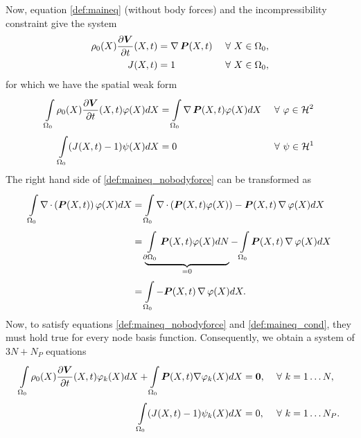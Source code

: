 Now, equation \eqref{def:maineq} (without body forces) and the incompressibility constraint give the system 
\begin{align}
	\rho_0(X)\frac{\partial \boldsymbol{V}}{\partial t}(X,t) &= \operatorname{\nabla}\boldsymbol{P}(X,t) && ~\forall~ X\in\Omega_0,\label{def:maineq_nobodyforce}\\
	J(X,t) &= 1 && ~\forall~ X\in\Omega_0,\label{def:maineq_cond}
\end{align}
for which we have the spatial weak form
\begin{align}
	\int\limits_{\Omega_0}^{}\rho_0(X)\frac{\partial \boldsymbol{V}}{\partial t}(X,t)\varphi(X)dX &= \int\limits_{\Omega_0}^{}\operatorname{\nabla}\boldsymbol{P}(X,t)\varphi(X)dX &&~\forall~ \varphi\in\mathcal{H}^2\\
	\int\limits_{\Omega_0}^{} (J(X,t)-1)\psi(X)dX &= 0 && ~\forall~ \psi\in\mathcal{H}^1
\end{align}
The right hand side of \eqref{def:maineq_nobodyforce} can be transformed as
\begin{align*}
	\int\limits_{\Omega_0}^{} \operatorname{\nabla}\cdot\left(\boldsymbol{P}(X,t)\right)\varphi(X) dX &= \int\limits_{\Omega_0}^{} \operatorname{\nabla}\cdot\left(\boldsymbol{P}(X,t)\varphi(X)\right) - \boldsymbol{P}(X,t)\operatorname{\nabla}\varphi(X) dX\\
		 &= \underbrace{\int\limits_{\partial\Omega_0}^{} \boldsymbol{P}(X,t)\varphi(X) dN}_{=0} - \int\limits_{\Omega_0}^{} \boldsymbol{P}(X,t)\operatorname{\nabla}\varphi(X)dX\\
		 &= \int\limits_{\Omega_0}^{} -\boldsymbol{P}(X,t)\operatorname{\nabla}\varphi(X) dX.
\end{align*}
Now, to satisfy equations \eqref{def:maineq_nobodyforce} and \eqref{def:maineq_cond}, they must hold true for every node basis function. 
Consequently, we obtain a system of $3N+N_P$ equations
\begin{align}
	\int\limits_{\Omega_0}^{} \rho_0(X)\frac{\partial \boldsymbol{V}}{\partial t}(X,t)\varphi_k(X)dX + \int\limits_{\Omega_0}^{}\boldsymbol{P}(X,t)\nabla\varphi_{k}(X) dX &= \boldsymbol{0}, && ~\forall~ k=1\ldots N,\label{def:weakform}\\
	\int\limits_{\Omega_0}^{} (J(X,t)-1)\psi_k(X)dX &= 0, && ~\forall~ k=1\ldots N_P.\label{def:weakform_nb}
\end{align}

